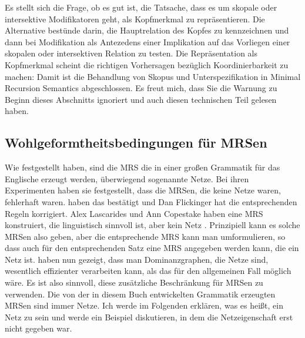 Es stellt sich die Frage, ob es gut ist, die Tatsache, dass es um skopale oder intersektive
Modifikatoren geht, als Kopfmerkmal zu repräsentieren. Die Alternative bestünde darin, die
Hauptrelation des Kopfes zu kennzeichnen und dann bei Modifikation als Antezedens einer Implikation
auf das Vorliegen einer skopalen oder intersektiven Relation zu testen. Die Repräsentation als
Kopfmerkmal scheint die richtigen Vorhersagen bezüglich Koordinierbarkeit zu machen:
\eal
{}
\zl
Damit ist die Behandlung von Skopus und Unterspezifikation in Minimal Recursion Semantics abgeschlossen. Es freut mich, dass Sie
die Warnung zu Beginn dieses Abschnitts ignoriert und auch diesen technischen Teil gelesen haben.

\subsection{Wohlgeformtheitsbedingungen für MRSen}
\label{sec-Wohlgeformtheitsbedingungen für MRSen}
\label{Abschnitt-Semantik-possessive-Relativpronomina}

Wie \citet*{FucKolNieTha2004a} festgestellt haben, sind die MRS die in einer großen Grammatik für
das Englische \citep{CF2000a-u} erzeugt werden, überwiegend sogenannte Netze. Bei ihren
Experimenten haben sie festgestellt, dass die MRSen, die keine Netze waren, fehlerhaft
waren. \citet*{FKT2005a} haben das bestätigt und Dan Flickinger hat die entsprechenden Regeln
korrigiert. Alex Lascarides und Ann Copestake haben eine MRS konstruiert, die linguistisch sinnvoll ist, aber
kein Netz \citep[Abschnitt~4.3]{FKT2005a}. Prinzipiell kann es solche MRSen also geben, aber die entsprechende MRS kann man
umformulieren, so dass auch für den entsprechenden Satz eine MRS angegeben werden kann, die ein Netz
ist. \citet{ADKMNT2003a} haben nun gezeigt, dass man Dominanzgraphen, die Netze sind, wesentlich effizienter
verarbeiten kann, als das für den allgemeinen Fall möglich wäre. Es ist also sinnvoll, diese
zusätzliche Beschränkung für MRSen zu verwenden. Die von der in diesem Buch entwickelten Grammatik
erzeugten MRSen sind immer Netze. Ich werde im Folgenden erklären, was es heißt, ein Netz zu sein
und werde ein Beispiel diskutieren, in dem die Netzeigenschaft erst nicht gegeben war. 

